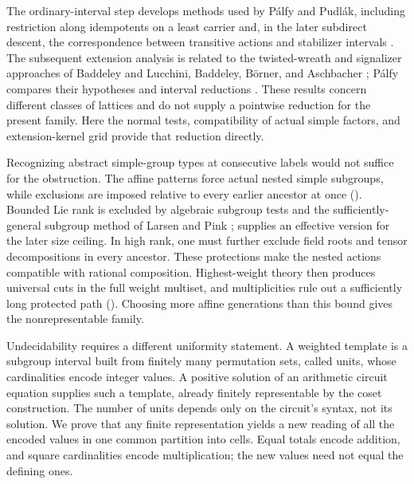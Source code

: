 The ordinary-interval step develops methods used by P\'alfy and
Pudl\'ak, including restriction along idempotents on a least carrier and,
in the later subdirect descent, the correspondence between transitive
actions and stabilizer intervals
\citep[Lemmas~1 and~3]{PalfyPudlak1980}.  The subsequent extension
analysis is related to the twisted-wreath and signalizer approaches of
Baddeley and Lucchini, Baddeley, B\"orner, and Aschbacher
\citep{BaddeleyLucchini1997,Baddeley1998,Borner1999,Aschbacher2008};
P\'alfy compares their hypotheses and interval reductions
\citep[Section~4]{PalfyTwisted}.  These results concern different classes
of lattices and do not supply a pointwise reduction for the present
family.  Here the normal tests, compatibility of actual simple factors,
and extension-kernel grid provide that reduction directly.

Recognizing abstract simple-group types at consecutive labels would not
suffice for the obstruction.  The affine patterns force actual nested
simple subgroups, while exclusions are imposed relative to every earlier
ancestor at once ().
Bounded Lie rank is excluded by algebraic subgroup tests and the
sufficiently-general subgroup method of Larsen and Pink
\citep[Theorem~0.5]{LarsenPink2011};  supplies an
effective version for the later size ceiling.  In high rank, one must
further exclude field roots and tensor decompositions in every ancestor.
These protections make the nested actions compatible with rational
composition.  Highest-weight theory then produces universal cuts in the
full weight multiset, and multiplicities rule out a sufficiently long
protected path ().  Choosing more affine
generations than this bound gives the nonrepresentable family.

Undecidability requires a different uniformity statement.  A weighted
template is a subgroup interval built from finitely many permutation
sets, called units, whose cardinalities encode integer values.  A
positive solution of an arithmetic circuit equation supplies such a
template, already finitely representable by the coset construction.
The number of units depends only on the circuit's syntax, not its
solution.  We prove that any finite representation yields a new reading
of all the encoded values in one common partition into cells.  Equal
totals encode addition, and square cardinalities encode multiplication;
the new values need not equal the defining ones.

